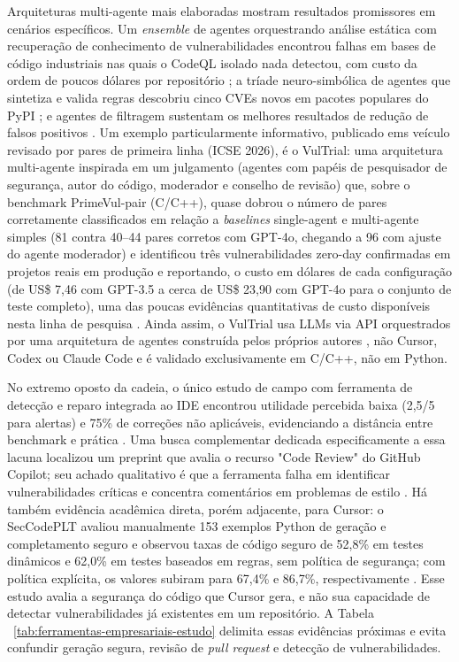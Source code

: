 Arquiteturas multi-agente mais elaboradas mostram resultados promissores em cenários específicos. Um \textit{ensemble} de agentes orquestrando análise estática com recuperação de conhecimento de vulnerabilidades encontrou falhas em bases de código industriais nas quais o CodeQL isolado nada detectou, com custo da ordem de poucos dólares por repositório \cite{Liang2026Argus}; a tríade neuro-simbólica de agentes que sintetiza e valida regras descobriu cinco CVEs novos em pacotes populares do PyPI \cite{Tsigkourakos2026QRS}; e agentes de filtragem sustentam os melhores resultados de redução de falsos positivos \cite{Ameen2026QASecClaw}. Um exemplo particularmente informativo, publicado ems veículo revisado por pares de primeira linha (ICSE 2026), é o VulTrial: uma arquitetura multi-agente inspirada em um julgamento (agentes com papéis de pesquisador de segurança, autor do código, moderador e conselho de revisão) que, sobre o benchmark PrimeVul-pair (C/C++), quase dobrou o número de pares corretamente classificados em relação a \textit{baselines} single-agent e multi-agente simples (81 contra 40–44 pares corretos com GPT-4o, chegando a 96 com ajuste do agente moderador) e identificou três vulnerabilidades zero-day confirmadas em projetos reais em produção e reportando,  o custo em dólares de cada configuração (de US\$ 7,46 com GPT-3.5 a cerca de US\$ 23,90 com GPT-4o para o conjunto de teste completo), uma das poucas evidências quantitativas de custo disponíveis nesta linha de pesquisa \cite{Widyasari2026VulTrial}. Ainda assim, o VulTrial usa LLMs via API orquestrados por uma arquitetura de agentes construída pelos próprios autores , não Cursor, Codex ou Claude Code e é validado exclusivamente em C/C++, não em Python.

No extremo oposto da cadeia, o único estudo de campo com ferramenta de detecção e reparo integrada ao IDE encontrou utilidade percebida baixa (2,5/5 para alertas) e 75\% de correções não aplicáveis, evidenciando a distância entre benchmark e prática \cite{Steenhoek2025IDEUserStudy}. Uma busca complementar dedicada especificamente a essa lacuna localizou um preprint que avalia o recurso "Code Review" do GitHub Copilot; seu achado qualitativo é que a ferramenta falha em identificar vulnerabilidades críticas e concentra comentários em problemas de estilo \cite{Amro2025CopilotReview}. Há também evidência acadêmica direta, porém adjacente, para Cursor: o SecCodePLT avaliou manualmente 153 exemplos Python de geração e completamento seguro e observou taxas de código seguro de 52,8\% em testes dinâmicos e 62,0\% em testes baseados em regras, sem política de segurança; com política explícita, os valores subiram para 67,4\% e 86,7\%, respectivamente \cite{Nie2025SecCodePLT}. Esse estudo avalia a segurança do código que Cursor gera, e não sua capacidade de detectar vulnerabilidades já existentes em um repositório. A Tabela ~\ref{tab:ferramentas-empresariais-estudo} delimita essas evidências próximas e evita confundir geração segura, revisão de \textit{pull request} e detecção de vulnerabilidades.



